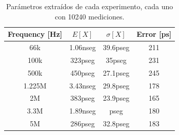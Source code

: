 \begin{table}[H]
     \centering
     \begin{tabular}{cccc}
     \hline
     Frequency {[}Hz{]} & $E[X]$   & $ \sigma[X]$ & Error {[}ps{]} \\ \hline
     66k                & 1.06nseg & 39.6pseg     & 211            \\ \hline
     100k               & 323pseg  & 35pseg       & 231            \\ \hline
     500k               & 450pseg  & 27.1pseg     & 245            \\ \hline
     1.225M             & 3.43nseg & 29.8pseg     & 178            \\ \hline
     2M                 & 383pseg  & 23.9pseg     & 165            \\ \hline
     3.3M               & 1.89nseg & pseg     & 180            \\ \hline
     5M                 & 286pseg  & 32.8pseg     & 183            \\ \hline
     \end{tabular}
     \caption{Parámetros extraídos de cada experimento, cada uno con 10240 mediciones.}
\end{table}

